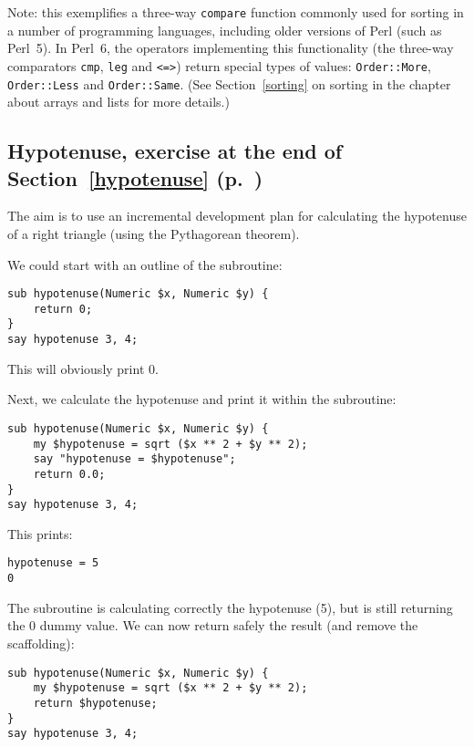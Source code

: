Note: this exemplifies a three-way {\tt compare} function 
commonly used for sorting in a number of programming 
languages, including older versions of Perl (such as 
Perl~5). In Perl~6, the operators implementing this 
functionality (the three-way comparators \verb'cmp', 
\verb'leg' and \verb'<=>') return special types of 
values: {\tt Order::More}, {\tt Order::Less} and 
{\tt Order::Same}. (See Section~\ref{sorting} 
\ifplastex \else
on sorting in the chapter about arrays and lists 
\fi
for more details.)

\subsection{Hypotenuse, exercise at the end of Section~\ref{hypotenuse} (p.~\pageref{hypotenuse})}
\label{sol_hypotenuse}

The aim is to use an incremental development plan for 
calculating the hypotenuse of a right triangle (using 
the Pythagorean theorem). 

We could start with an outline of the subroutine:

\begin{verbatim}
sub hypotenuse(Numeric $x, Numeric $y) {
    return 0;
}
say hypotenuse 3, 4;
\end{verbatim}
%

This will obviously print 0.

Next, we calculate the hypotenuse and print it within the subroutine:

\begin{verbatim}
sub hypotenuse(Numeric $x, Numeric $y) {
    my $hypotenuse = sqrt ($x ** 2 + $y ** 2);
    say "hypotenuse = $hypotenuse";
    return 0.0;
}
say hypotenuse 3, 4;
\end{verbatim}
%

This prints:

\begin{verbatim}
hypotenuse = 5
0
\end{verbatim}
%

The subroutine is calculating correctly the hypotenuse (5), 
but is still returning the 0 dummy value. We can now return 
safely the result (and remove the scaffolding):

\begin{verbatim}
sub hypotenuse(Numeric $x, Numeric $y) {
    my $hypotenuse = sqrt ($x ** 2 + $y ** 2);
    return $hypotenuse;
}
say hypotenuse 3, 4;
\end{verbatim}
%

